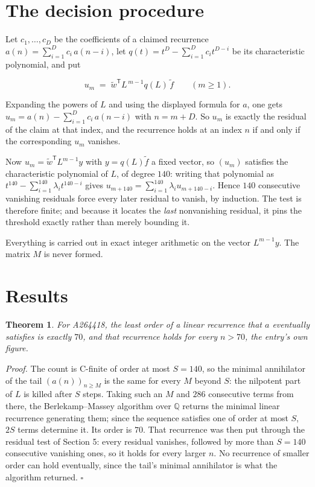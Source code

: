 \documentclass[11pt]{article}
\newtheorem{theorem}{Theorem}
\theoremstyle{definition}
\begin{document}
\section{The decision procedure}

Let $c_1,\dots,c_D$ be the coefficients of a claimed recurrence $a(n) = \sum_{i=1}^{D} c_i\,a(n-i)$, let $q(t) = t^{D} - \sum_{i=1}^{D} c_i t^{D-i}$ be its characteristic polynomial, and put

\[u_m \;=\; \tilde w^{\mathsf T} L^{\,m-1} q(L)\,\tilde f \qquad (m \ge 1).\]

Expanding the powers of $L$ and using the displayed formula for $a$, one gets $u_m = a(n) - \sum_{i=1}^{D} c_i\,a(n-i)$ with $n = m + D$. So $u_m$ is exactly the residual of the claim at that index, and the recurrence holds at an index $n$ if and only if the corresponding $u_m$ vanishes.

Now $u_m = \tilde w^{\mathsf T} L^{m-1} y$ with $y = q(L)\tilde f$ a fixed vector, so $(u_m)$ satisfies the characteristic polynomial of $L$, of degree $140$: writing that polynomial as $t^{140} - \sum_{i=1}^{140} \lambda_i t^{140-i}$ gives $u_{m+140} = \sum_{i=1}^{140} \lambda_i u_{m+140-i}$. Hence $140$ consecutive vanishing residuals force every later residual to vanish, by induction. The test is therefore finite; and because it locates the {\itshape last} nonvanishing residual, it pins the threshold exactly rather than merely bounding it.

Everything is carried out in exact integer arithmetic on the vector $L^{m-1}y$. The matrix $M$ is never formed.

\section{Results}

\begin{theorem} For A264418, the least order of a linear recurrence that $a$ eventually satisfies is exactly $70$, and that recurrence holds for every $n > 70$, the entry's own figure.\end{theorem}

{\itshape Proof.} The count is C-finite of order at most $S = 140$, so the minimal annihilator of the tail $(a(n))_{n \ge M}$ is the same for every $M$ beyond $S$: the nilpotent part of $L$ is killed after $S$ steps. Taking such an $M$ and $286$ consecutive terms from there, the Berlekamp--Massey algorithm over $\mathbb{Q}$ returns the minimal linear recurrence generating them; since the sequence satisfies one of order at most $S$, $2S$ terms determine it. Its order is $70$. That recurrence was then put through the residual test of Section 5: every residual vanishes, followed by more than $S = 140$ consecutive vanishing ones, so it holds for every larger $n$. No recurrence of smaller order can hold eventually, since the tail's minimal annihilator is what the algorithm returned. $\square$
\end{document}
